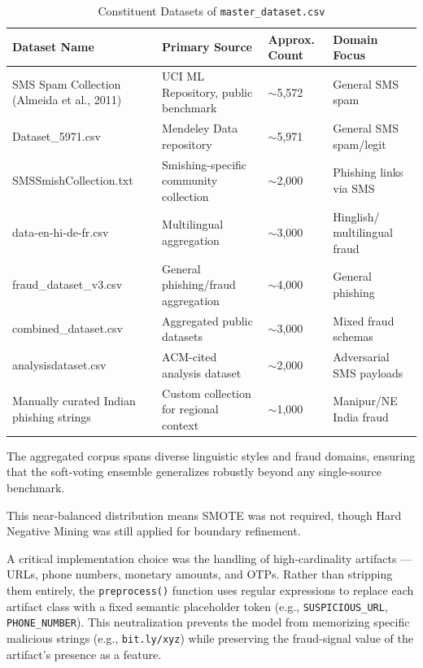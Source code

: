 \begin{table}[H]
    \centering
    \caption{Constituent Datasets of \texttt{master\_dataset.csv}}
    \label{tab:dataset_provenance}
    \small
    \begin{tabular}{|p{3.8cm}|p{4.0cm}|p{1.8cm}|p{3.2cm}|}
    \hline
    \textbf{Dataset Name} & \textbf{Primary Source} & \textbf{Approx. Count} & \textbf{Domain Focus} \\ \hline
    SMS Spam Collection \newline (Almeida et al., 2011) & UCI ML Repository, public benchmark & $\sim$5,572 & General SMS spam \\ \hline
    Dataset\_5971.csv & Mendeley Data repository & $\sim$5,971 & General SMS spam/legit \\ \hline
    SMSSmishCollection.txt & Smishing-specific community collection & $\sim$2,000 & Phishing links via SMS \\ \hline
    data-en-hi-de-fr.csv & Multilingual aggregation & $\sim$3,000 & Hinglish/ multilingual fraud \\ \hline
    fraud\_dataset\_v3.csv & General phishing/fraud aggregation & $\sim$4,000 & General phishing \\ \hline
    combined\_dataset.csv & Aggregated public datasets & $\sim$3,000 & Mixed fraud schemas \\ \hline
    analysisdataset.csv & ACM-cited analysis dataset & $\sim$2,000 & Adversarial SMS payloads \\ \hline
    Manually curated Indian phishing strings & Custom collection for regional context & $\sim$1,000 & Manipur/NE India fraud \\ \hline
    \end{tabular}
\end{table}

The aggregated corpus spans diverse linguistic styles and fraud domains, ensuring that the soft-voting ensemble generalizes robustly beyond any single-source benchmark.

This near-balanced distribution means SMOTE \cite{chawla2002smote} was not required, though Hard Negative Mining was still applied for boundary refinement.

A critical implementation choice was the handling of high-cardinality artifacts --- URLs, phone numbers, monetary amounts, and OTPs. Rather than stripping them entirely, the \texttt{preprocess()} function uses regular expressions \cite{friedl2006mastering} to replace each artifact class with a fixed semantic placeholder token (e.g., \texttt{SUSPICIOUS\_URL}, \texttt{PHONE\_NUMBER}). This neutralization prevents the model from memorizing specific malicious strings (e.g., \texttt{bit.ly/xyz}) while preserving the fraud-signal value of the artifact's presence as a feature.

